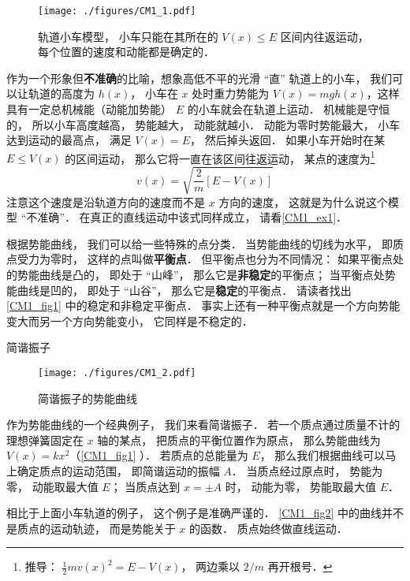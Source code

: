 \begin{figure}[ht]
\centering
\texttt{[image: ./figures/CM1\_1.pdf]}
\caption{轨道小车模型， 小车只能在其所在的 $V(x) \leqslant E$ 区间内往返运动， 每个位置的速度和动能都是确定的．} \label{CM1_fig1}
\end{figure}

作为一个形象但\textbf{不准确}的比喻，想象高低不平的光滑 “直” 轨道上的小车， 我们可以让轨道的高度为 $h(x)$， 小车在 $x$ 处时重力势能为 $V(x) = mgh(x)$，这样具有一定总机械能（动能加势能） $E$ 的小车就会在轨道上运动． 机械能是守恒的， 所以小车高度越高， 势能越大， 动能就越小． 动能为零时势能最大， 小车达到运动的最高点， 满足 $V(x) = E$， 然后掉头返回． 如果小车开始时在某 $E \leq V(x)$ 的区间运动， 那么它将一直在该区间往返运动， 某点的速度为\footnote{推导： $\frac{1}{2}mv(x)^2 = E - V(x)$， 两边乘以 $2/m$ 再开根号．}
\begin{equation}\label{CM1_eq1}
v(x) = \sqrt{\frac{2}{m}[E - V(x)]}
\end{equation}
注意这个速度是沿轨道方向的速度而不是 $x$ 方向的速度， 这就是为什么说这个模型 “不准确”． 在真正的直线运动中该式同样成立， 请看\autoref{CM1_ex1}．

根据势能曲线， 我们可以给一些特殊的点分类． 当势能曲线的切线为水平， 即质点受力为零时， 这样的点叫做\textbf{平衡点}． 但平衡点也分为不同情况： 如果平衡点处的势能曲线是凸的， 即处于 “山峰”， 那么它是\textbf{非稳定}的平衡点； 当平衡点处势能曲线是凹的， 即处于 “山谷”， 那么它是\textbf{稳定}的平衡点． 请读者找出\autoref{CM1_fig1} 中的稳定和非稳定平衡点． 事实上还有一种平衡点就是一个方向势能变大而另一个方向势能变小， 它同样是不稳定的．


\begin{example}{简谐振子}\label{CM1_ex1}
\begin{figure}[ht]
\centering
\texttt{[image: ./figures/CM1\_2.pdf]}
\caption{简谐振子的势能曲线} \label{CM1_fig2}
\end{figure}

作为势能曲线的一个经典例子， 我们来看简谐振子． 若一个质点通过质量不计的理想弹簧固定在 $x$ 轴的某点， 把质点的平衡位置作为原点， 那么势能曲线为 $V(x) = kx^2$（\autoref{CM1_fig1} ）． 若质点的总能量为 $E$， 那么我们根据曲线可以马上确定质点的运动范围， 即简谐运动的振幅 $A$． 当质点经过原点时， 势能为零， 动能取最大值 $E$； 当质点达到 $x = \pm A$ 时， 动能为零， 势能取最大值 $E$．
\end{example}
相比于上面小车轨道的例子， 这个例子是准确严谨的． \autoref{CM1_fig2} 中的曲线并不是质点的运动轨迹， 而是势能关于 $x$ 的函数． 质点始终做直线运动．

